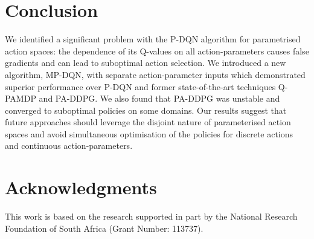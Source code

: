 \documentclass{article}
\def\PDQN*{P\nobreakdash-DQN}
\def\MPDQN*{MP\nobreakdash-DQN}
\def\QPAMDP*{Q\nobreakdash-PAMDP}
\def\PADDPG*{PA\nobreakdash-DDPG}
\begin{document}
\section{Conclusion}
We identified a significant problem with the \PDQN* algorithm for parametrised action spaces: the dependence of its Q-values on all action-parameters causes false gradients and can lead to suboptimal action selection. We introduced a new algorithm, \MPDQN*, with separate action-parameter inputs which demonstrated superior performance over \PDQN* and former state-of-the-art techniques \QPAMDP* and \PADDPG*. We also found that \PADDPG* was unstable and converged to suboptimal policies on some domains. Our results suggest that future approaches should leverage the disjoint nature of parameterised action spaces and avoid simultaneous optimisation of the policies for discrete actions and continuous action-parameters.

\section*{Acknowledgments}
This work is based on the research supported in part by the National Research Foundation of South Africa (Grant Number: 113737).



\end{document}
